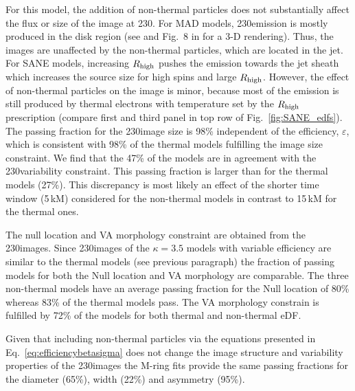 \label{varkappa230}
For this model, the addition of non-thermal particles does not substantially affect the flux or size of the image at 230\GHz. For MAD models, 230\GHz emission is mostly produced in the disk region (see  and Fig.~8 in \citealt{Wong_2022} for a 3-D rendering).  Thus, the images are unaffected by the non-thermal particles, which are located in the jet. For SANE models, increasing $R_\mathrm{high}$ pushes the emission towards the jet sheath which increases the source size for high spins and large $R_\mathrm{high}$. However, the effect of non-thermal particles on the image is minor, because most of the emission is still produced by thermal electrons with temperature set by the $R_\mathrm{high}$ prescription (compare first and third panel in top row of Fig.~\ref{fig:SANE_edfs}). The passing fraction for the 230\GHz image size is 98\% independent of the efficiency, $\varepsilon$, which is consistent with 98\% of the thermal models fulfilling the image size constraint. We find that the 47\% of the models are in agreement with the 230\GHz variability constraint. This passing fraction is larger than for the thermal models (27\%). This discrepancy is most likely an effect of the shorter time window (5\,kM) considered for the non-thermal models in contrast to 15\,kM for the thermal ones. 

The null location and VA morphology constraint are obtained from the 230\GHz images. Since 230\GHz images of the $\kappa=3.5$ models with variable efficiency are similar to the thermal models (see previous paragraph) the fraction of passing models for both the Null location and VA morphology are comparable. The three non-thermal models have an average passing fraction for the Null location of 80\% whereas 83\% of the thermal models pass. The VA morphology constrain is fulfilled by 72\% of the models for both thermal and non-thermal eDF.  

Given that including non-thermal particles via the equations presented in Eq.~\ref{eq:efficiencybetasigma} does not change the image structure and variability properties of the 230\GHz images the M-ring fits provide the same passing fractions for the diameter (65\%), width (22\%) and asymmetry (95\%).

